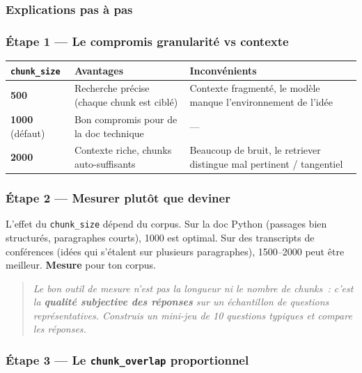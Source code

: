 \documentclass[11pt,a4paper]{article}
\begin{document}
\subsubsection{Explications pas à pas}

\subsubsection*{Étape 1 — Le compromis granularité vs contexte}

\begin{center}
\begin{tabular}{p{2.5cm} p{5cm} p{5cm}}
\toprule
\textbf{\texttt{chunk\_size}} & \textbf{Avantages} & \textbf{Inconvénients} \\
\midrule
\textbf{500}
& Recherche précise (chaque chunk est ciblé)
& Contexte fragmenté, le modèle manque l'environnement de l'idée \\[1mm]
\textbf{1000} (défaut)
& Bon compromis pour de la doc technique
& — \\[1mm]
\textbf{2000}
& Contexte riche, chunks auto-suffisants
& Beaucoup de bruit, le retriever distingue mal pertinent / tangentiel \\
\bottomrule
\end{tabular}
\end{center}

\subsubsection*{Étape 2 — Mesurer plutôt que deviner}

L'effet du \texttt{chunk\_size} dépend du corpus. Sur la doc Python
(passages bien structurés, paragraphes courts), 1000 est optimal. Sur
des transcripts de conférences (idées qui s'étalent sur plusieurs
paragraphes), 1500--2000 peut être meilleur. \textbf{Mesure} pour ton
corpus.

\begin{quote}\itshape
Le bon outil de mesure n'est pas la longueur ni le nombre de chunks~:
c'est la \textbf{qualité subjective des réponses} sur un échantillon
de questions représentatives. Construis un mini-jeu de 10 questions
typiques et compare les réponses.
\end{quote}

\subsubsection*{Étape 3 — Le \texttt{chunk\_overlap} proportionnel}
\end{document}
